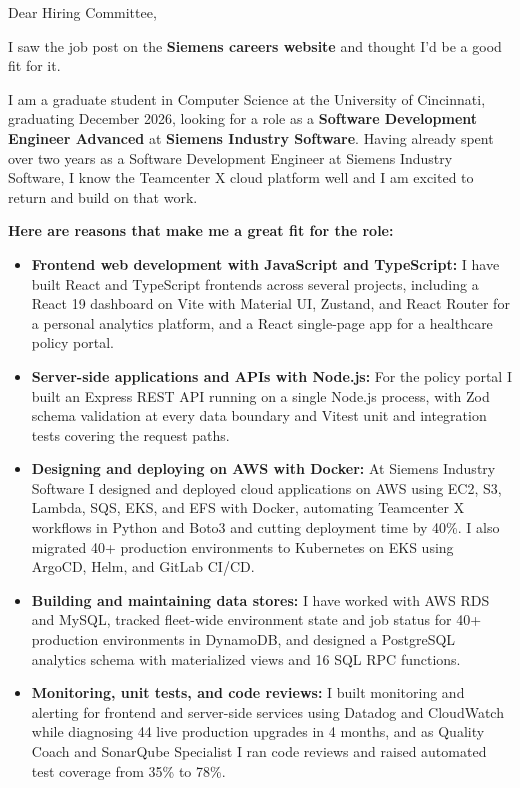 \documentclass[11pt]{letter}
\date{}
\begin{document}
\begin{letter}{}

\opening{Dear Hiring Committee,}

I saw the job post on the \textbf{Siemens careers website} and thought I'd be a good fit for it.

I am a graduate student in Computer Science at the University of Cincinnati, graduating December 2026, looking for a role as a \textbf{Software Development Engineer Advanced} at \textbf{Siemens Industry Software}. Having already spent over two years as a Software Development Engineer at Siemens Industry Software, I know the Teamcenter X cloud platform well and I am excited to return and build on that work.

\textbf{Here are reasons that make me a great fit for the role:}

\begin{itemize}[leftmargin=*, itemsep=0.45em]
    \item \textbf{Frontend web development with JavaScript and TypeScript:} I have built React and TypeScript frontends across several projects, including a React 19 dashboard on Vite with Material UI, Zustand, and React Router for a personal analytics platform, and a React single-page app for a healthcare policy portal.

    \item \textbf{Server-side applications and APIs with Node.js:} For the policy portal I built an Express REST API running on a single Node.js process, with Zod schema validation at every data boundary and Vitest unit and integration tests covering the request paths.

    \item \textbf{Designing and deploying on AWS with Docker:} At Siemens Industry Software I designed and deployed cloud applications on AWS using EC2, S3, Lambda, SQS, EKS, and EFS with Docker, automating Teamcenter X workflows in Python and Boto3 and cutting deployment time by 40\%. I also migrated 40+ production environments to Kubernetes on EKS using ArgoCD, Helm, and GitLab CI/CD.

    \item \textbf{Building and maintaining data stores:} I have worked with AWS RDS and MySQL, tracked fleet-wide environment state and job status for 40+ production environments in DynamoDB, and designed a PostgreSQL analytics schema with materialized views and 16 SQL RPC functions.

    \item \textbf{Monitoring, unit tests, and code reviews:} I built monitoring and alerting for frontend and server-side services using Datadog and CloudWatch while diagnosing 44 live production upgrades in 4 months, and as Quality Coach and SonarQube Specialist I ran code reviews and raised automated test coverage from 35\% to 78\%.
\end{itemize}


\end{letter}
\end{document}
